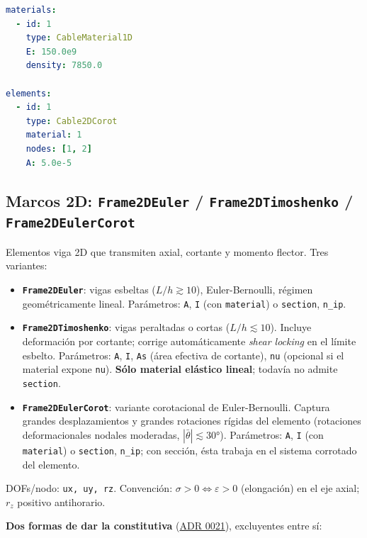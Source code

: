 \documentclass[11pt,oneside]{report}
\begin{document}
\begin{lstlisting}[language=yaml]
materials:
  - id: 1
    type: CableMaterial1D
    E: 150.0e9
    density: 7850.0

elements:
  - id: 1
    type: Cable2DCorot
    material: 1
    nodes: [1, 2]
    A: 5.0e-5

\end{lstlisting}

\subsection{Marcos 2D: \texttt{Frame2DEuler} / \texttt{Frame2DTimoshenko} / \texttt{Frame2DEulerCorot}}

Elementos viga 2D que transmiten axial, cortante y momento flector. Tres variantes:

\begin{itemize}
  \item \textbf{\texttt{Frame2DEuler}}: vigas esbeltas ($L/h \gtrsim 10$), Euler-Bernoulli, régimen geométricamente lineal. Parámetros: \texttt{A}, \texttt{I} (con \texttt{material}) o \texttt{section}, \texttt{n\_ip}.
  \item \textbf{\texttt{Frame2DTimoshenko}}: vigas peraltadas o cortas ($L/h \lesssim 10$). Incluye deformación por cortante; corrige automáticamente \textit{shear locking} en el límite esbelto. Parámetros: \texttt{A}, \texttt{I}, \texttt{As} (área efectiva de cortante), \texttt{nu} (opcional si el material expone \texttt{nu}). \textbf{Sólo material elástico lineal}; todavía no admite \texttt{section}.
  \item \textbf{\texttt{Frame2DEulerCorot}}: variante corotacional de Euler-Bernoulli. Captura grandes desplazamientos y grandes rotaciones rígidas del elemento (rotaciones deformacionales nodales moderadas, $|\bar\theta| \lesssim 30°$). Parámetros: \texttt{A}, \texttt{I} (con \texttt{material}) o \texttt{section}, \texttt{n\_ip}; con sección, ésta trabaja en el sistema corrotado del elemento.
\end{itemize}

DOFs/nodo: \texttt{ux, uy, rz}. Convención: $\sigma > 0 \Leftrightarrow \varepsilon > 0$ (elongación) en el eje axial; $r_z$ positivo antihorario.

\textbf{Dos formas de dar la constitutiva} (\href{https://github.com/jretamav/solidum-fem/blob/main/docs/adr/0021-secciones-de-marco-y-seccion-por-fibras.md}{ADR 0021}), excluyentes entre sí:
\end{document}
